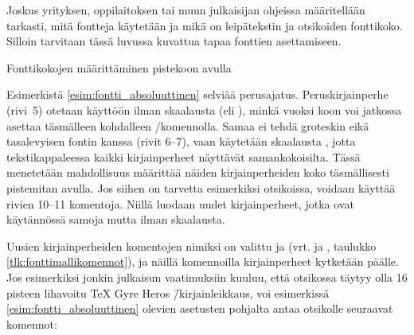 Joskus yrityksen, oppilaitoksen tai muun julkaisijan ohjeissa
määritellään tarkasti, mitä fontteja käytetään ja mikä on leipätekstin
ja otsikoiden fonttikoko. Silloin tarvitaan tässä luvussa kuvattua tapaa
fonttien asettamiseen.

\begin{esimerkki*}
\caption{Fonttikokojen määrittäminen pistekoon avulla}
\label{esim:fontti_absoluuttinen}
\end{esimerkki*}

Esimerkistä \ref{esim:fontti_absoluuttinen} selviää perus\-ajatus.
Peruskirjainperhe (rivi~5) otetaan käyttöön ilman skaalausta (eli
), minkä vuoksi koon voi jatkossa asettaa täsmälleen
kohdalleen \-/komennolla. Samaa ei tehdä groteskin
eikä tasalevyisen fontin kanssa (rivit 6--7), vaan käytetään skaalausta
, jotta tekstikappaleessa kaikki kirjainperheet
näyttävät samankokoisilta. Tässä menetetään mahdollisuus määrittää
näiden kirjainperheiden koko täsmällisesti pistemitan avulla. Jos siihen
on tarvetta esimerkiksi otsikoissa, voidaan käyttää rivien 10--11
komentoja. Niillä luodaan uudet kirjainperheet, jotka ovat käytännössä
samoja mutta ilman skaalausta.

Uusien kirjainperheiden komentojen nimiksi on valittu  ja  (vrt. 
ja , taulukko \ref{tlk:fonttimallikomennot}), ja
näillä komennoilla kirjainperheet kytketään päälle. Jos esimerkiksi
jonkin julkaisun vaatimuksiin kuuluu, että otsikossa täytyy olla 16
pisteen lihavoitu TeX Gyre Heros \=/kirjainleikkaus, voi esimerkissä
\ref{esim:fontti_absoluuttinen} olevien asetusten pohjalta antaa
otsikolle seuraavat komennot:

